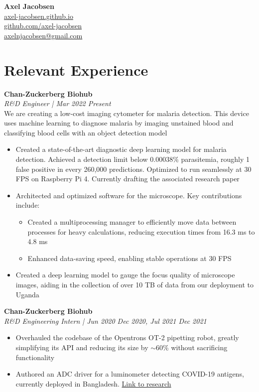 \documentclass[letterpaper,10pt]{article}
\begin{document}
\noindent
{\Large\bf Axel Jacobsen} \\
\href{https://axel-jacobsen.github.io}{axel-jacobsen.github.io} \\
\href{https://github.com/axel-jacobsen}{github.com/axel-jacobsen} \\
\href{mailto:axelnjacobsen@gmail.com}{axelnjacobsen@gmail.com}

\section*{Relevant Experience}

\noindent
{\bf Chan-Zuckerberg Biohub} \\
\textit{R\&D Engineer | Mar 2022 \- Present} \\
We are creating a low-cost imaging cytometer for malaria detection. This device uses machine learning to diagnose malaria by imaging unstained blood and classifying blood cells with an object detection model
\begin{itemize}
    \item Created a state-of-the-art diagnostic deep learning model for malaria detection. Achieved a detection limit below 0.00038\% parasitemia, roughly 1 false positive in every 260,000 predictions. Optimized to run seamlessly at 30 FPS on Raspberry Pi 4. Currently drafting the associated research paper
    \item Architected and optimized software for the microscope. Key contributions include:
    \begin{itemize}
        \item Created a multiprocessing manager to efficiently move data between processes for heavy calculations, reducing execution times from 16.3 ms to 4.8 ms
        \item Enhanced data-saving speed, enabling stable operations at 30 FPS
    \end{itemize}
    \item Created a deep learning model to gauge the focus quality of microscope images, aiding in the collection of over 10 TB of data from our deployment to Uganda
\end{itemize}

\noindent
{\bf Chan-Zuckerberg Biohub} \\
\textit{R\&D Engineering Intern | Jun 2020 \- Dec 2020, Jul 2021 \- Dec 2021}
\begin{itemize}
    \item Overhauled the codebase of the Opentrons OT-2 pipetting robot, greatly simplifying its API and reducing its size by $\sim$60\% without sacrificing functionality
    \item Authored an ADC driver for a luminometer detecting COVID-19 antigens, currently deployed in Bangladesh. \href{https://www.medrxiv.org/content/10.1101/2023.05.18.23290120v1}{Link to research}
\end{itemize}
\end{document}
